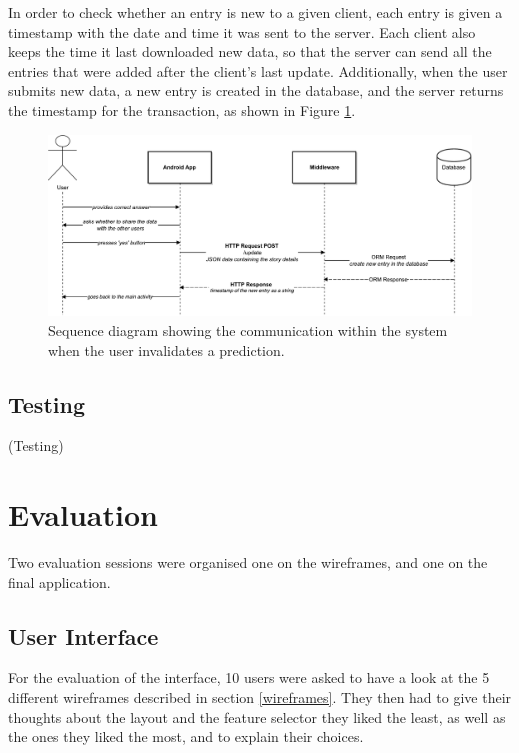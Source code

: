 \documentclass{mproj}
\begin{document}
In order to check whether an entry is new to a given client, each entry is given a timestamp with the date and time it was sent to the server. Each client also keeps the time it last downloaded new data, so that the server can send all the entries that were added after the client's last update. Additionally, when the user submits new data, a new entry is created in the database, and the server returns the timestamp for the transaction, as shown in Figure \ref{fig:new_entry}.\par
\begin{figure}[h]
	\centering
	\includegraphics[trim=0cm 0cm 0cm 2cm, width=\textwidth]{images/wrong_prediction_diagram}
	\caption{Sequence diagram showing the communication within the system when the user invalidates a prediction.}
	\label{fig:new_entry}
\end{figure}

\section{Testing}

(Testing)

\chapter{Evaluation}\label{evaluation}

Two evaluation sessions were organised one on the wireframes, and one on the final application. 

\section{User Interface}

For the evaluation of the interface, 10 users were asked to have a look at the 5 different wireframes described in section \ref{wireframes}. They then had to give their thoughts about the layout and the feature selector they liked the least, as well as the ones they liked the most, and to explain their choices.
\end{document}
